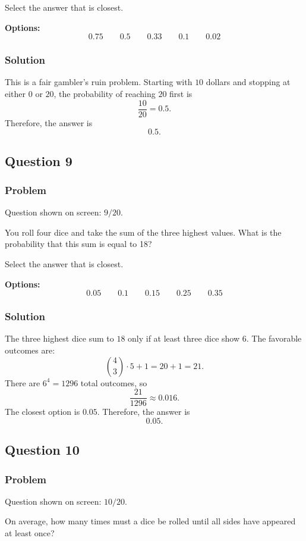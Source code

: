 \documentclass[12pt]{article}
\begin{document}
Select the answer that is closest.

\noindent\textbf{Options:}
\[
\boxed{0.75}
\qquad
\boxed{0.5}
\qquad
\boxed{0.33}
\qquad
\boxed{0.1}
\qquad
\boxed{0.02}
\]

\subsubsection{Solution}
This is a fair gambler's ruin problem. Starting with \(10\) dollars and stopping at either \(0\) or \(20\), the probability of reaching \(20\) first is
\[
\frac{10}{20}=0.5.
\]
Therefore, the answer is
\[
\boxed{0.5}.
\]

\subsection{Question 9}
\subsubsection{Problem}
Question shown on screen: \(9/20\).

You roll four dice and take the sum of the three highest values. What is the probability that this sum is equal to 18?

Select the answer that is closest.

\noindent\textbf{Options:}
\[
\boxed{0.05}
\qquad
\boxed{0.1}
\qquad
\boxed{0.15}
\qquad
\boxed{0.25}
\qquad
\boxed{0.35}
\]

\subsubsection{Solution}
The three highest dice sum to \(18\) only if at least three dice show \(6\). The favorable outcomes are:
\[
\binom{4}{3}\cdot 5+1=20+1=21.
\]
There are \(6^4=1296\) total outcomes, so
\[
\frac{21}{1296}\approx 0.016.
\]
The closest option is \(0.05\). Therefore, the answer is
\[
\boxed{0.05}.
\]

\subsection{Question 10}
\subsubsection{Problem}
Question shown on screen: \(10/20\).

On average, how many times must a dice be rolled until all sides have appeared at least once?
\end{document}
